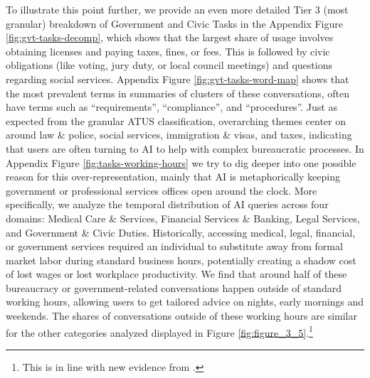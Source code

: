 \documentclass[11pt,a4paper]{article}
\begin{document}
To illustrate this point further, we provide an even more detailed Tier 3 (most granular) breakdown of Government and Civic Tasks in the Appendix Figure \ref{fig:gvt-tasks-decomp}, which shows that the largest share of usage involves obtaining licenses and paying taxes, fines, or fees. This is followed by civic obligations (like voting, jury duty, or local council meetings) and questions regarding social services. Appendix Figure \ref{fig:gvt-tasks-word-map} shows that the most prevalent terms in summaries of clusters of these conversations, often have terms such as ``requirements'', ``compliance'', and ``procedures''. Just as expected from the granular ATUS classification, overarching themes center on around law \& police, social services, immigration \& visas, and taxes, indicating that users are often turning to AI to help with complex bureaucratic processes. In Appendix Figure \ref{fig:tasks-working-hours} we try to dig deeper into one possible reason for this over-representation, mainly that AI is metaphorically keeping government or professional services offices open around the clock. More specifically, we analyze the temporal distribution of AI queries across four domains: Medical Care \& Services, Financial Services \& Banking, Legal Services, and Government \& Civic Duties. Historically, accessing medical, legal, financial, or government services required an individual to substitute away from formal market labor during standard business hours, potentially creating a shadow cost of lost wages or lost workplace productivity. We find that around half of these bureaucracy or government-related conversations happen outside of standard working hours, allowing users to get tailored advice on nights, early mornings and weekends. The shares of conversations outside of these working hours are similar for the other categories analyzed displayed in Figure \ref{fig:figure_3_5}.\footnote{This is in line with new evidence from \cite{anthropic2026aeiv6}.}
\end{document}
